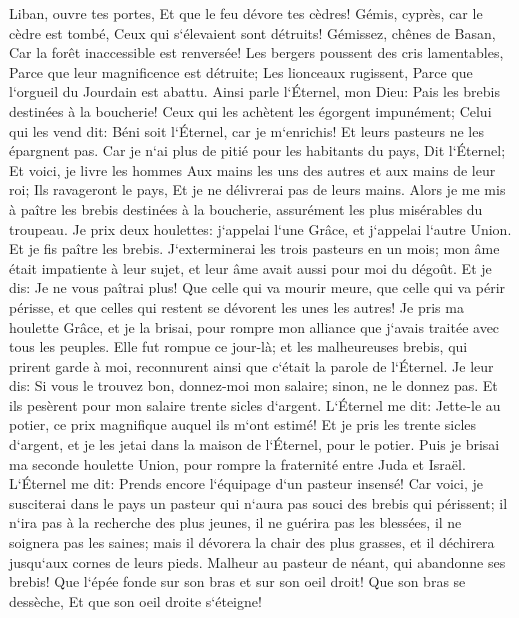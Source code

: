 \verse Liban, ouvre tes portes, Et que le feu dévore tes cèdres! 
\verse Gémis, cyprès, car le cèdre est tombé, Ceux qui s`élevaient sont détruits! Gémissez, chênes de Basan, Car la forêt inaccessible est renversée! 
\verse Les bergers poussent des cris lamentables, Parce que leur magnificence est détruite; Les lionceaux rugissent, Parce que l`orgueil du Jourdain est abattu. 
\verse Ainsi parle l`Éternel, mon Dieu: Pais les brebis destinées à la boucherie! 
\verse Ceux qui les achètent les égorgent impunément; Celui qui les vend dit: Béni soit l`Éternel, car je m`enrichis! Et leurs pasteurs ne les épargnent pas. 
\verse Car je n`ai plus de pitié pour les habitants du pays, Dit l`Éternel; Et voici, je livre les hommes Aux mains les uns des autres et aux mains de leur roi; Ils ravageront le pays, Et je ne délivrerai pas de leurs mains. 
\verse Alors je me mis à paître les brebis destinées à la boucherie, assurément les plus misérables du troupeau. Je prix deux houlettes: j`appelai l`une Grâce, et j`appelai l`autre Union. Et je fis paître les brebis. 
\verse J`exterminerai les trois pasteurs en un mois; mon âme était impatiente à leur sujet, et leur âme avait aussi pour moi du dégoût. 
\verse Et je dis: Je ne vous paîtrai plus! Que celle qui va mourir meure, que celle qui va périr périsse, et que celles qui restent se dévorent les unes les autres! 
\verse Je pris ma houlette Grâce, et je la brisai, pour rompre mon alliance que j`avais traitée avec tous les peuples. 
\verse Elle fut rompue ce jour-là; et les malheureuses brebis, qui prirent garde à moi, reconnurent ainsi que c`était la parole de l`Éternel. 
\verse Je leur dis: Si vous le trouvez bon, donnez-moi mon salaire; sinon, ne le donnez pas. Et ils pesèrent pour mon salaire trente sicles d`argent. 
\verse L`Éternel me dit: Jette-le au potier, ce prix magnifique auquel ils m`ont estimé! Et je pris les trente sicles d`argent, et je les jetai dans la maison de l`Éternel, pour le potier. 
\verse Puis je brisai ma seconde houlette Union, pour rompre la fraternité entre Juda et Israël. 
\verse L`Éternel me dit: Prends encore l`équipage d`un pasteur insensé! 
\verse Car voici, je susciterai dans le pays un pasteur qui n`aura pas souci des brebis qui périssent; il n`ira pas à la recherche des plus jeunes, il ne guérira pas les blessées, il ne soignera pas les saines; mais il dévorera la chair des plus grasses, et il déchirera jusqu`aux cornes de leurs pieds. 
\verse Malheur au pasteur de néant, qui abandonne ses brebis! Que l`épée fonde sur son bras et sur son oeil droit! Que son bras se dessèche, Et que son oeil droite s`éteigne! 

